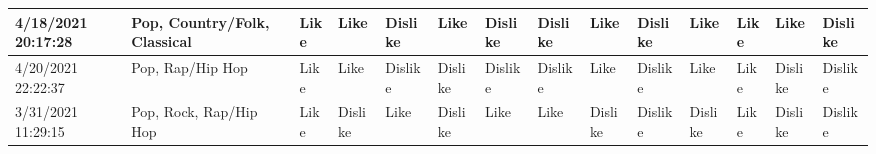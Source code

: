 \begin{table}
{\begin{tabular}{|l|l|l|l|l|l|l|l|l|l|l|l|l|l|}
        4/18/2021 20:17:28 & Pop, Country/Folk, Classical & Like & Like & Dislike & Like & Dislike & Dislike & Like & Dislike & Like & Like & Like & Dislike \\ \hline
        4/20/2021 22:22:37 & Pop, Rap/Hip Hop & Like & Like & Dislike & Dislike & Dislike & Dislike & Like & Dislike & Like & Like & Dislike & Dislike \\ \hline
        3/31/2021 11:29:15 & Pop, Rock, Rap/Hip Hop & Like & Dislike & Like & Dislike & Like & Like & Dislike & Dislike & Dislike & Like & Dislike & Dislike \\ \hline
    \end{tabular}%
    }
\end{table}
